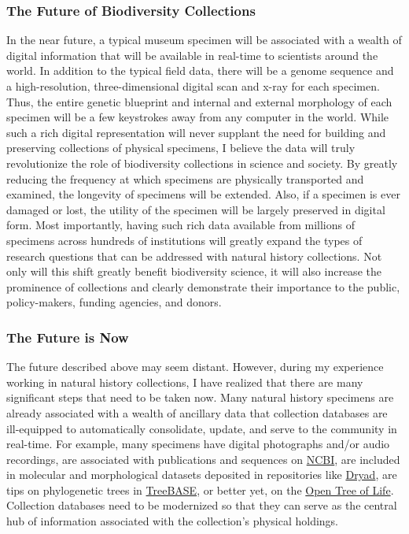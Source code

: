 \subsubsection*{The Future of Biodiversity Collections}
In the near future, a typical museum specimen will be associated
with a wealth of digital information that will be available in real-time
to scientists around the world.
In addition to the typical field data, there will be a genome sequence
and a high-resolution, three-dimensional digital scan and x-ray for each
specimen.
Thus, the entire genetic blueprint and internal and external morphology of 
each specimen will be a few keystrokes away from any computer in the world.
While such a rich digital representation will never supplant the need for
building and preserving collections of physical specimens, I believe the data
will truly revolutionize the role of biodiversity collections in science and
society.
By greatly reducing the frequency at which specimens are physically transported
and examined, the longevity of specimens will be extended.
Also, if a specimen is ever damaged or lost, the utility of the specimen will
be largely preserved in digital form.
Most importantly, having such rich data available from millions of specimens
across hundreds of institutions will greatly expand the types of research
questions that can be addressed with natural history collections.
Not only will this shift greatly benefit biodiversity science, it will also
increase the prominence of collections and clearly demonstrate their importance
to the public, policy-makers, funding agencies, and donors.


\subsubsection*{The Future is Now}
The future described above may seem distant.
However, during my experience working in natural history collections, I have
realized that there are many significant steps that need to be taken now.
Many natural history specimens are already associated with a wealth of ancillary
data that collection databases are ill-equipped to automatically consolidate,
update, and serve to the community in real-time.
For example, many specimens 
have digital photographs and/or audio recordings,
are associated with publications and sequences on
\href{http://www.ncbi.nlm.nih.gov}{NCBI}, are included in molecular and
morphological datasets deposited in repositories like
\href{http://datadryad.org}{Dryad}, are tips on phylogenetic trees in
\href{http://treebase.org/treebase-web/home.html}{TreeBASE}, or better yet, on
the \href{http://opentreeoflife.org}{Open Tree of Life}.
Collection databases need to be modernized so that they can serve
as the central hub of information associated with the collection's
physical holdings.

